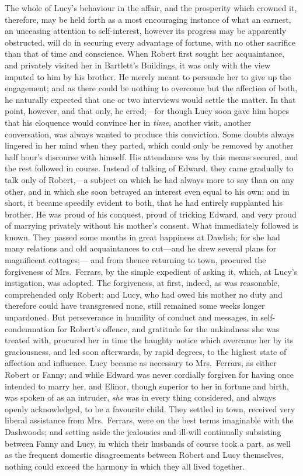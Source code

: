 \documentclass{article}
\begin{document}
The whole of Lucy's behaviour in the affair,
and the prosperity which crowned it, therefore, may be held
forth as a most encouraging instance of what an earnest,
an unceasing attention to self-interest, however its progress
may be apparently obstructed, will do in securing every
advantage of fortune, with no other sacrifice than that of time
and conscience.  When Robert first sought her acquaintance,
and privately visited her in Bartlett's Buildings,
it was only with the view imputed to him by his brother.
He merely meant to persuade her to give up the engagement;
and as there could be nothing to overcome but the affection
of both, he naturally expected that one or two interviews
would settle the matter.  In that point, however,
and that only, he erred;---for though Lucy soon gave him
hopes that his eloquence would convince her in \emph{time},
another visit, another conversation, was always wanted
to produce this conviction.  Some doubts always lingered
in her mind when they parted, which could only be
removed by another half hour's discourse with himself.
His attendance was by this means secured, and the rest
followed in course.  Instead of talking of Edward,
they came gradually to talk only of Robert,---a subject
on which he had always more to say than on any other,
and in which she soon betrayed an interest even equal
to his own; and in short, it became speedily evident
to both, that he had entirely supplanted his brother.
He was proud of his conquest, proud of tricking Edward,
and very proud of marrying privately without his
mother's consent.  What immediately followed is known.
They passed some months in great happiness at Dawlish;
for she had many relations and old acquaintances to
cut---and he drew several plans for magnificent cottages;---%
and from thence returning to town, procured the forgiveness
of Mrs.\ Ferrars, by the simple expedient of asking it,
which, at Lucy's instigation, was adopted.  The forgiveness,
at first, indeed, as was reasonable, comprehended only Robert;
and Lucy, who had owed his mother no duty and therefore
could have transgressed none, still remained some weeks
longer unpardoned.  But perseverance in humility of conduct
and messages, in self-condemnation for Robert's offence,
and gratitude for the unkindness she was treated with,
procured her in time the haughty notice which overcame
her by its graciousness, and led soon afterwards, by rapid
degrees, to the highest state of affection and influence.
Lucy became as necessary to Mrs.\ Ferrars, as either Robert
or Fanny; and while Edward was never cordially forgiven
for having once intended to marry her, and Elinor,
though superior to her in fortune and birth, was spoken
of as an intruder, \emph{she} was in every thing considered,
and always openly acknowledged, to be a favourite child.
They settled in town, received very liberal assistance
from Mrs.\ Ferrars, were on the best terms imaginable
with the Dashwoods; and setting aside the jealousies
and ill-will continually subsisting between Fanny and Lucy,
in which their husbands of course took a part, as well
as the frequent domestic disagreements between Robert and
Lucy themselves, nothing could exceed the harmony in which
they all lived together.
\end{document}

